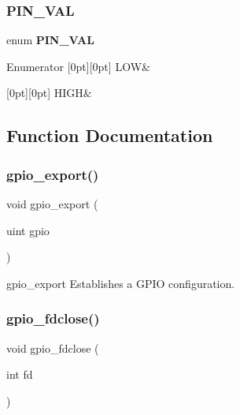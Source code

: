 \subsubsection{P\+I\+N\+\_\+\+V\+AL}
{\footnotesize\ttfamily enum \textbf{ P\+I\+N\+\_\+\+V\+AL}}

\begin{DoxyEnumFields}{Enumerator}
[0pt][0pt]{}\mbox{\label{gpio_8h_aef3bc6bb9a2e13070a0f1096d7b3af46a6a226f4143ca3b18999551694cdb72a8}} 
L\+OW&\\
\hline

[0pt][0pt]{}\mbox{\label{gpio_8h_aef3bc6bb9a2e13070a0f1096d7b3af46a0c3a1dacf94061154b3ee354359c5893}} 
H\+I\+GH&\\
\hline

\end{DoxyEnumFields}


\subsection{Function Documentation}
\mbox{\label{gpio_8h_a5dbb5086ddc8eaadfb743bcfaa0da2c3}} 
\subsubsection{gpio\+\_\+export()}
{\footnotesize\ttfamily void gpio\+\_\+export (\begin{DoxyParamCaption}\item[{uint}]{gpio }\end{DoxyParamCaption})}

gpio\+\_\+export Establishes a G\+P\+IO configuration. \mbox{\label{gpio_8h_ab4f8efa8c5e55c51fe86069e1e41f3c7}} 
\subsubsection{gpio\+\_\+fdclose()}
{\footnotesize\ttfamily void gpio\+\_\+fdclose (\begin{DoxyParamCaption}\item[{int}]{fd }\end{DoxyParamCaption})}

